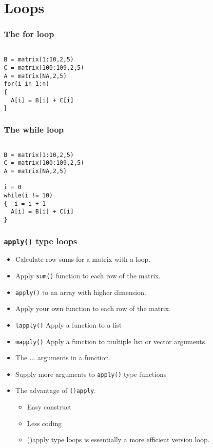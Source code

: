 \documentclass[10pt]{beamer}
\begin{document}
\section{Loops}

\begin{frame}[fragile]
  \frametitle{The for loop}

\begin{verbatim}

B = matrix(1:10,2,5)
C = matrix(100:109,2,5)
A = matrix(NA,2,5)
for(i in 1:n)
{
  A[i] = B[i] + C[i]
}
\end{verbatim}
\end{frame}

\begin{frame}[fragile]
  \frametitle{The while loop}

\begin{verbatim}

B = matrix(1:10,2,5)
C = matrix(100:109,2,5)
A = matrix(NA,2,5)

i = 0
while(i != 10)
{  i = i + 1
  A[i] = B[i] + C[i]
}
\end{verbatim}
\end{frame}


\begin{frame}[allowframebreaks]
  \frametitle{\texttt{apply()} type loops}

  \begin{itemize}
  \item Calculate row sums for a matrix with a loop.
  \item Apply \texttt{sum()} function to each row of the matrix.

  \item \texttt{apply()} to an array with higher dimension.

  \item Apply your own function to each row of the matrix.
  \item \texttt{lapply()} Apply a function to a list

  \item \texttt{mapply()} Apply a function to multiple list or vector arguments.
  \item The ... arguments in a function.
  \item Supply more arguments to \texttt{apply()} type functions

  \item The advantage of \texttt{()apply}.

    \begin{itemize}
    \item Easy construct
    \item Less coding
    \item ()apply type loops is essentially a more efficient version loop.
    \end{itemize}
  \end{itemize}

\end{frame}
\end{document}
